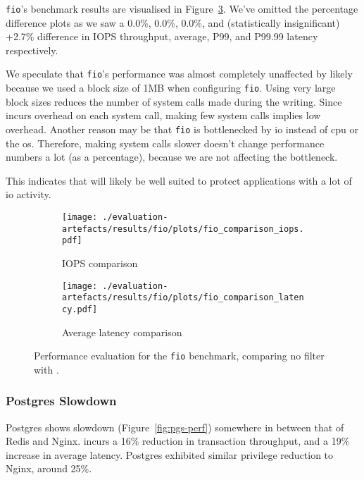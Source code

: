 \texttt{fio}'s benchmark results are visualised in Figure~\ref{fig:fio-perf}.
We've omitted the percentage difference plots as we saw a 0.0\%, 0.0\%, 0.0\%, and
(statistically insignificant) +2.7\% difference in IOPS throughput, average,
P99, and P99.99 latency respectively. 

We speculate that \texttt{fio}'s performance was almost completely
unaffected by \af likely because we used a block size of 1MB when
configuring \texttt{fio}. Using very large block sizes reduces the number of
system calls made during the writing. Since \af incurs overhead on each
system call, making few system calls implies low overhead. Another reason
may be that \texttt{fio} is bottlenecked by \ac{io} instead of \ac{cpu} or
the \ac{os}. Therefore, making system calls slower doesn't change performance
numbers a lot (as a percentage), because we are not affecting the bottleneck.

This indicates that \af will likely be well suited to protect applications with
a lot of \ac{io} activity.

\begin{figure}[htbp]
    \centering
    \begin{subfigure}[b]{0.48\textwidth}
        \centering
        \texttt{[image: ./evaluation-artefacts/results/fio/plots/fio\_comparison\_iops.pdf]}
        \caption{IOPS comparison}
        \label{fig:fio-iops}
    \end{subfigure}
    \hfill %
    \begin{subfigure}[b]{0.48\textwidth}
        \centering
        \texttt{[image: ./evaluation-artefacts/results/fio/plots/fio\_comparison\_latency.pdf]}
        \caption{Average latency comparison}
        \label{fig:fio-latency}
    \end{subfigure}

    \medskip %
    
    \caption{Performance evaluation for the \texttt{fio} benchmark, comparing no
    filter with \af{}.} %
    \label{fig:fio-perf}
\end{figure}

\subsubsection{Postgres Slowdown}\label{subsubsec:postgres-slowdown}

Postgres shows slowdown (Figure~\ref{fig:pgs-perf}) somewhere in between that
of Redis and Nginx. \af incurs a 16\% reduction in transaction throughput, and
a 19\% increase in average latency. Postgres exhibited similar privilege
reduction to Nginx, around 25\%. 

